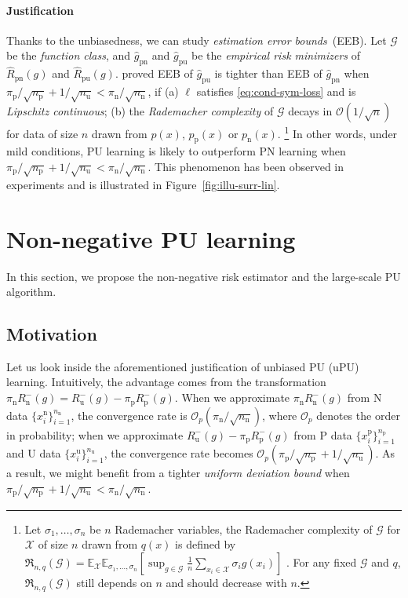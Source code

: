 \documentclass{article}
\newcommand{\bE}{\mathbb{E}}
\newcommand{\cG}{\mathcal{G}}
\newcommand{\cO}{\mathcal{O}}
\newcommand{\cX}{\mathcal{X}}
\newcommand{\fR}{\mathfrak{R}}
\newcommand{\prp}{p_\mathrm{p}}
\newcommand{\prn}{p_\mathrm{n}}
\newcommand{\pip}{\pi_\mathrm{p}}
\newcommand{\pin}{\pi_\mathrm{n}}
\newcommand{\xp}{x^\mathrm{p}}
\newcommand{\xn}{x^\mathrm{n}}
\newcommand{\xu}{x^\mathrm{u}}
\newcommand{\Np}{{n_\mathrm{p}}}
\newcommand{\Nn}{{n_\mathrm{n}}}
\newcommand{\Nu}{{n_\mathrm{u}}}
\newcommand{\Rp}{R_\mathrm{p}}
\newcommand{\Rn}{R_\mathrm{n}}
\newcommand{\Ru}{R_\mathrm{u}}
\newcommand{\hRpn}{\widehat{R}_\mathrm{pn}}
\newcommand{\hRpu}{\widehat{R}_\mathrm{pu}}
\newcommand{\hgpn}{\widehat{g}_\mathrm{pn}}
\newcommand{\hgpu}{\widehat{g}_\mathrm{pu}}
\begin{document}
\paragraph{Justification}
Thanks to the unbiasedness, we can study \emph{estimation error bounds}~(EEB). Let $\cG$ be the \emph{function class}, and $\hgpn$ and $\hgpu$ be the \emph{empirical risk minimizers} of $\hRpn(g)$ and $\hRpu(g)$. \cite{niu16nips} proved EEB of $\hgpu$ is tighter than EEB of $\hgpn$ when $\pip/\sqrt{\Np}+1/\sqrt{\Nu}<\pin/\sqrt{\Nn}$, if
(a) $\ell$ satisfies \eqref{eq:cond-sym-loss} and is \emph{Lipschitz continuous};
(b) the \emph{Rademacher complexity} of $\cG$ decays in $\cO(1/\sqrt{n})$ for data of size $n$ drawn from $p(x)$, $\prp(x)$ or $\prn(x)$.%
\footnote{Let $\sigma_1,\ldots,\sigma_n$ be $n$ Rademacher variables, the Rademacher complexity of $\cG$ for $\cX$ of size $n$ drawn from $q(x)$ is defined by $\fR_{n,q}(\cG) = \bE_\cX\bE_{\sigma_1,\ldots,\sigma_n} [\sup_{g\in\cG}\frac{1}{n}\sum_{x_i\in\cX}\sigma_ig(x_i)]$ \citep{mohri12FML}. For any fixed $\cG$ and $q$, $\fR_{n,q}(\cG)$ still depends on $n$ and should decrease with $n$.}
In other words, under mild conditions, PU learning is likely to outperform PN learning when $\pip/\sqrt{\Np}+1/\sqrt{\Nu}<\pin/\sqrt{\Nn}$. This phenomenon has been observed in experiments \citep{niu16nips} and is illustrated in Figure~\ref{fig:illu-surr-lin}.

\section{Non-negative PU learning}
\label{sec:nnpu}%

In this section, we propose the non-negative risk estimator and the large-scale PU algorithm.

\subsection{Motivation}

Let us look inside the aforementioned justification of unbiased PU (uPU) learning. Intuitively, the advantage comes from the transformation $\pin\Rn^-(g)=\Ru^-(g)-\pip\Rp^-(g)$. When we approximate $\pin\Rn^-(g)$ from N data $\{\xn_i\}_{i=1}^\Nn$, the convergence rate is $\cO_p(\pin/\sqrt{\Nn})$, where $\cO_p$ denotes the order in probability; when we approximate $\Ru^-(g)-\pip\Rp^-(g)$ from P data $\{\xp_i\}_{i=1}^\Np$ and U data $\{\xu_i\}_{i=1}^\Nu$, the convergence rate becomes $\cO_p(\pip/\sqrt{\Np}+1/\sqrt{\Nu})$. As a result, we might benefit from a tighter \emph{uniform deviation bound} when $\pip/\sqrt{\Np}+1/\sqrt{\Nu}<\pin/\sqrt{\Nn}$.
\end{document}

